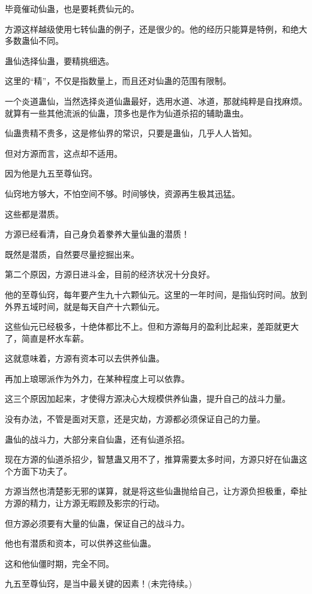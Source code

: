 \begin{this_body}
毕竟催动仙蛊，也是要耗费仙元的。

方源这样越级使用七转仙蛊的例子，还是很少的。他的经历只能算是特例，和绝大多数蛊仙不同。

蛊仙选择仙蛊，要精挑细选。

这里的“精”，不仅是指数量上，而且还对仙蛊的范围有限制。

一个炎道蛊仙，当然选择炎道仙蛊最好，选用水道、冰道，那就纯粹是自找麻烦。就算有一些其他流派的仙蛊，顶多也是作为仙道杀招的辅助蛊虫。

仙蛊贵精不贵多，这是修仙界的常识，只要是蛊仙，几乎人人皆知。

但对方源而言，这点却不适用。

因为他是九五至尊仙窍。

仙窍地方够大，不怕空间不够。时间够快，资源再生极其迅猛。

这些都是潜质。

方源已经看清，自己身负着豢养大量仙蛊的潜质！

既然是潜质，自然要尽量挖掘出来。

第二个原因，方源日进斗金，目前的经济状况十分良好。

他的至尊仙窍，每年要产生九十六颗仙元。这里的一年时间，是指仙窍时间。放到外界五域时间，就是每天自产十六颗仙元。

这些仙元已经极多，十绝体都比不上。但和方源每月的盈利比起来，差距就更大了，简直是杯水车薪。

这就意味着，方源有资本可以去供养仙蛊。

再加上琅琊派作为外力，在某种程度上可以依靠。

这三个原因加起来，才使得方源决心大规模供养仙蛊，提升自己的战斗力量。

没有办法，不管是面对天意，还是灾劫，方源都必须保证自己的力量。

蛊仙的战斗力，大部分来自仙蛊，还有仙道杀招。

现在方源的仙道杀招少，智慧蛊又用不了，推算需要太多时间，方源只好在仙蛊这个方面下功夫了。

方源当然也清楚影无邪的谋算，就是将这些仙蛊抛给自己，让方源负担极重，牵扯方源的精力，让方源无暇顾及影宗的行动。

但方源必须要有大量的仙蛊，保证自己的战斗力。

他也有潜质和资本，可以供养这些仙蛊。

这和他仙僵时期，完全不同。

九五至尊仙窍，是当中最关键的因素！(未完待续。)

\end{this_body}

